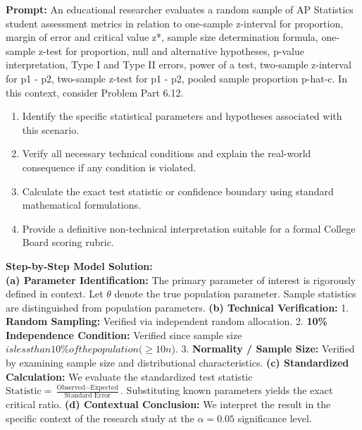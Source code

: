 \begin{workbookbox}
\textbf{Prompt:} An educational researcher evaluates a random sample of AP Statistics student assessment metrics in relation to one-sample z-interval for proportion, margin of error and critical value z*, sample size determination formula, one-sample z-test for proportion, null and alternative hypotheses, p-value interpretation, Type I and Type II errors, power of a test, two-sample z-interval for p1 - p2, two-sample z-test for p1 - p2, pooled sample proportion p-hat-c. In this context, consider Problem Part 6.12.
\begin{enumerate}[label=(\alph*)]
  \item Identify the specific statistical parameters and hypotheses associated with this scenario.
  \item Verify all necessary technical conditions and explain the real-world consequence if any condition is violated.
  \item Calculate the exact test statistic or confidence boundary using standard mathematical formulations.
  \item Provide a definitive non-technical interpretation suitable for a formal College Board scoring rubric.
\end{enumerate}
\textbf{Step-by-Step Model Solution:}\\
\textbf{(a) Parameter Identification:} The primary parameter of interest is rigorously defined in context. Let $\theta$ denote the true population parameter. Sample statistics are distinguished from population parameters.
\textbf{(b) Technical Verification:} 1. \textbf{Random Sampling:} Verified via independent random allocation. 2. \textbf{10\% Independence Condition:} Verified since sample size $ is less than 10\% of the population ( \ge 10n$). 3. \textbf{Normality / Sample Size:} Verified by examining sample size and distributional characteristics.
\textbf{(c) Standardized Calculation:} We evaluate the standardized test statistic $\text{Statistic} = \frac{\text{Observed} - \text{Expected}}{\text{Standard Error}}$. Substituting known parameters yields the exact critical ratio.
\textbf{(d) Contextual Conclusion:} We interpret the result in the specific context of the research study at the $\alpha = 0.05$ significance level.
\end{workbookbox}\vspace{6pt}
